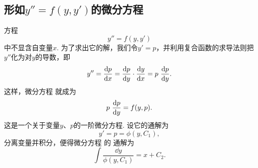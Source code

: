\subsection{\texorpdfstring{形如\(y'' = f(y,y')\)}{由因变量与一阶导数确定二阶导数}的微分方程}
方程\begin{equation}\label{equation:微分方程.二阶微分方程.0111型}
	y'' = f(y, y')
\end{equation}
中不显含自变量\(x\).
为了求出它的解，我们令\(y'=p\)，并利用复合函数的求导法则把\(y''\)化为对\(y\)的导数，即\begin{equation*}
	y'' = \dv{p}{x} = \dv{p}{y} \cdot \dv{y}{x} = p~\dv{p}{y}.
\end{equation*}
这样，微分方程  就成为\begin{equation*}
	p~\dv{p}{y} = f(y, p).
\end{equation*}
这是一个关于变量\(y\)、\(p\)的一阶微分方程.
设它的通解为\begin{equation*}
	y' = p = \phi(y, C_1),
\end{equation*}
分离变量并积分，便得微分方程  的
通解为\begin{equation}\label{equation:微分方程.二阶微分方程.0111型.通解}
	\int \frac{\dd{y}}{\phi(y,C_1)} = x + C_2.
\end{equation}

